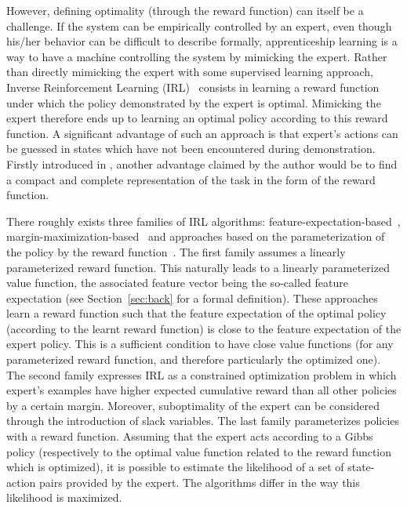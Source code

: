 \documentclass{llncs}
\begin{document}
However, defining optimality (through the reward function) can
itself be a challenge. If the system can be empirically controlled
by an expert, even though his/her behavior can be difficult to
describe formally, apprenticeship learning is a way to have a
machine controlling the system by mimicking the expert. Rather than
directly mimicking the expert with some supervised learning
approach, Inverse Reinforcement Learning (IRL)~\citep{ng2000algorithms}
consists in learning a reward function under which the policy
demonstrated by the expert is optimal. Mimicking the expert therefore
ends up to learning an optimal policy according to this reward
function. A significant advantage of such an approach is that
expert's actions can be guessed in states which have not been
encountered during demonstration. Firstly introduced in \citep{russell1998learning}, another advantage claimed by the author would be to
find a compact and complete representation of the task in the form
of the reward function.

There roughly exists three families of IRL algorithms:
feature-expectation-based~\citep{abbeel2004apprenticeship,syed2008apprenticeship,syed2008game,ziebart2008maximum},
margin-maximization-based~\citep{ratliff2006maximum,ratliff2007imitation,ratliff2007boosting,kolter2008hierarchical}
and approaches based on the parameterization of the policy by the
reward function~\citep{ramachandran2007bayesian,neu2007apprenticeship}. The first family
assumes a linearly parameterized reward function. This naturally
leads to a linearly parameterized value function, the associated
feature vector being the so-called feature expectation (see Section~\ref{sec:back} for a formal definition).
These approaches learn a reward function such that the feature
expectation of the optimal policy (according to the learnt reward
function) is close to the feature expectation of the expert policy.
This is a sufficient condition to have close value functions (for any parameterized reward function, and therefore particularly the optimized one). The
second family expresses IRL as a constrained optimization problem in
which expert's examples have higher expected cumulative reward than all other
policies by a certain margin. Moreover, suboptimality of the expert
can be considered through the introduction of slack variables. The
last family parameterizes policies with a reward function. Assuming
that the expert acts according to a Gibbs policy (respectively to
the optimal value function related to the reward function which is
optimized), it is possible to estimate the likelihood of a set of
state-action pairs provided by the expert. The algorithms differ in
the way this likelihood is maximized.
\end{document}
